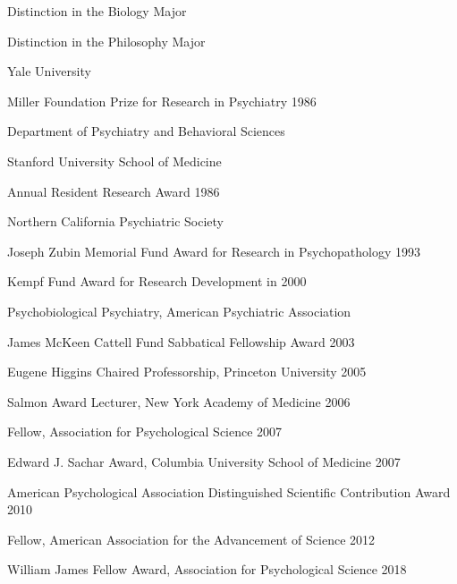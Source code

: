 \documentclass[10 pt]{article}
\begin{document}
Distinction in the Biology Major

Distinction in the Philosophy Major

Yale University
    \smallskip

Miller Foundation Prize for Research in Psychiatry \hspace{2.44in} 1986

Department of Psychiatry and Behavioral Sciences

Stanford University School of Medicine
    \smallskip

Annual Resident Research Award \hspace{3.5in} 1986

Northern California Psychiatric Society
    \smallskip

Joseph Zubin Memorial Fund Award for Research in Psychopathology \hspace{1.28in} 1993
    \smallskip

Kempf Fund Award for Research Development in \hspace{2.55in} 2000

Psychobiological Psychiatry, American Psychiatric Association
    \smallskip

James McKeen Cattell Fund Sabbatical Fellowship Award \hspace{2.02in} 2003
    \smallskip

Eugene Higgins Chaired Professorship, Princeton University \hspace{1.91in} 2005
    \smallskip

Salmon Award Lecturer, New York Academy of Medicine \hspace{2.07in} 2006
    \smallskip

Fellow, Association for Psychological Science \hspace{2.84in} 2007
    \smallskip

Edward J. Sachar Award, Columbia University School of Medicine \hspace{1.52in} 2007
    \smallskip

American Psychological Association Distinguished Scientific Contribution Award \hspace{0.65in} 2010
    \smallskip

Fellow, American Association for the Advancement of Science \hspace{1.81in} 2012
    \smallskip

William James Fellow Award, Association for Psychological Science \hspace{1.45in} 2018
    \smallskip
\end{document}
